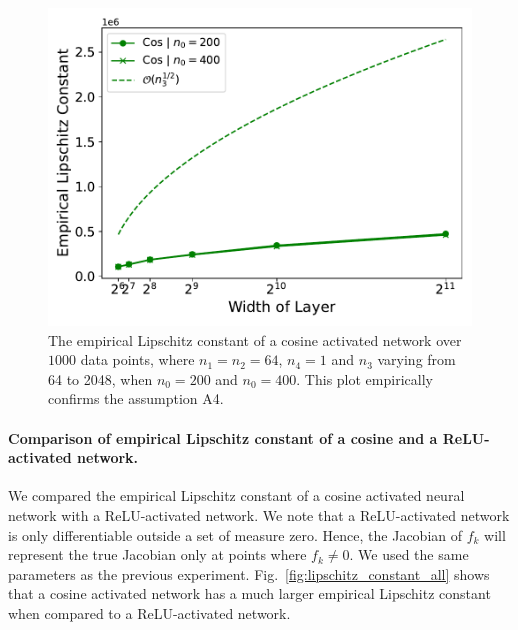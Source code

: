 \documentclass{article}
\theoremstyle{plain}
\theoremstyle{definition}
\theoremstyle{remark}
\begin{document}
\begin{figure}
\includegraphics[width=1.0\linewidth]{experiments/ICML_lipschitz_constant_cos.pdf}
\hspace{-0.4cm}
\caption{The empirical Lipschitz constant of a cosine activated network over $1000$ data points, where $n_1 = n_2 = 64$, $n_4 = 1$ and $n_3$ varying from 64 to 2048,  when $n_0 = 200$ and $n_0 =400$. This plot empirically confirms the assumption A4.  }\label{fig:lipschitz_constant_cos}
\end{figure}


\paragraph{Comparison of empirical Lipschitz constant of a cosine and a ReLU-activated network.}We compared the empirical Lipschitz constant of a cosine activated neural network with a ReLU-activated network. We note that a ReLU-activated network is only differentiable outside a set of measure zero. Hence, the Jacobian of $f_k$ will represent the true Jacobian only at points where $f_k \neq 0$. 
We used the same parameters as the previous experiment.
Fig.~\ref{fig:lipschitz_constant_all} shows that a cosine activated network has a much larger empirical Lipschitz constant when compared to a ReLU-activated network. 
\end{document}
